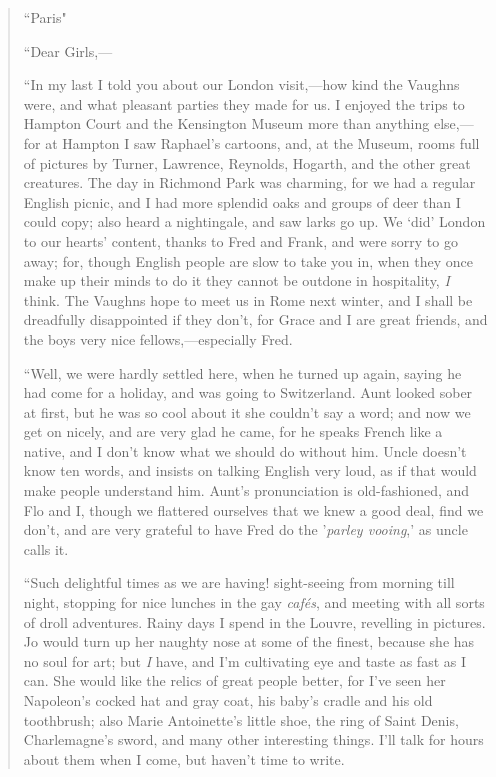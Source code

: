 \begin{quote}
``Paris"

``Dear Girls,---

``In my last I told you about our London visit,---how kind the Vaughns
were, and what pleasant parties they made for us. I enjoyed the trips to
Hampton Court and the Kensington Museum more than anything else,---for
at Hampton I saw Raphael's cartoons, and, at the Museum,
rooms full of pictures by Turner, Lawrence, Reynolds, Hogarth, and the
other great creatures. The day in Richmond Park was charming, for we had
a regular English picnic, and I had more splendid oaks and groups of
deer than I could copy; also heard a nightingale, and saw larks go up.
We `did' London to our
hearts' content, thanks to Fred and Frank, and were
sorry to go away; for, though English people are slow to take you in,
when they once make up their minds to do it they cannot be outdone in
hospitality, \emph{I} think. The Vaughns hope to meet us in Rome next
winter, and I shall be dreadfully disappointed if they
don't, for Grace and I are great friends, and the boys
very nice fellows,---especially Fred.

``Well, we were hardly settled here, when he turned up again, saying he
had come for a holiday, and was going to Switzerland. Aunt looked sober
at first, but he was so cool about it she couldn't say a
word; and now we get on nicely, and are very glad he came, for he speaks
French like a native, and I don't know what we should do
without him. Uncle doesn't know ten words, and insists
on talking English very loud, as if that would make people understand
him. Aunt's pronunciation is old-fashioned, and Flo and
I, though we flattered ourselves that we knew a good deal, find we
don't, and are very grateful to have Fred do the
'\emph{parley vooing},' as uncle calls
it.

``Such delightful times as we are having! sight-seeing from morning till
night, stopping for nice lunches in the gay \emph{cafés}, and meeting
with all sorts of droll adventures. Rainy days I spend in the Louvre,
revelling in pictures. Jo would turn up her naughty nose at some of the
finest, because she has no soul for art; but \emph{I} have, and
I'm cultivating eye and taste as fast as I can. She
would like the relics of great people better, for I've
seen her Napoleon's cocked hat and gray coat, his
baby's cradle and his old toothbrush; also Marie
Antoinette's little shoe, the ring of Saint Denis,
Charlemagne's sword, and many other interesting things.
I'll talk for hours about them when I come, but
haven't time to write.


\end{quote}
